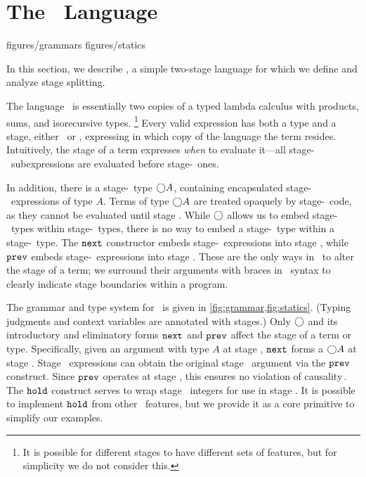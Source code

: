 \section{The \lang\ Language}
\label{sec:semantics}

 {figures/grammars}
 {figures/statics}

In this section, we describe \lang, a simple two-stage language
for which we define and analyze stage splitting.

The language \lang\ is essentially two copies of a typed lambda calculus with
products, sums, and isorecursive types.%
\footnote{It is possible for different stages to have different sets of
features, but for simplicity we do not consider this.}
Every valid expression has both a type and a stage, either \bbone~or \bbtwo,
expressing in which copy of the language the term resides. Intuitively, the
stage of a term expresses \emph{when} to evaluate it---all stage-\bbone\
subexpressions are evaluated before stage-\bbtwo\ ones.

In addition, there is a stage-\bbone\ type $\bigcirc A$, containing encapsulated
stage-\bbtwo\ expressions of type $A$. Terms of type $\bigcirc A$ are treated
opaquely by stage-\bbone\ code, as they cannot be evaluated until stage \bbtwo.
While $\bigcirc$ allows us to embed stage-\bbtwo\ types within stage-\bbone\ types,
there is no way to embed a stage-\bbone\ type within a stage-\bbtwo\ type.
The ${\tt next}$ constructor embeds stage-\bbtwo\ expressions into stage \bbone,
while ${\tt prev}$ embeds stage-\bbone\ expressions into stage \bbtwo.  These are the
only ways in \lang\ to alter the stage of a term; we surround their arguments
with braces in \lang\ syntax to clearly indicate stage boundaries within a
program.

The grammar and type system for \lang\ is given in
\ref{fig:grammar,fig:statics}. (Typing judgments and context variables are annotated with stages.)
Only $\bigcirc$ and its introductory and eliminatory forms ${\tt next}$ and ${\tt prev}$ affect the stage
of a term or type.
Specifically, given an argument with type $A$ at stage \bbtwo, ${\tt next}$ forms a $\bigcirc A$ at stage \bbone.  
Stage \bbtwo\ expressions can obtain the original stage \bbtwo\ argument via the ${\tt prev}$ construct.  
Since ${\tt prev}$ operates at stage \bbtwo, this ensures no violation of causality\,\cite{cave14}.
The ${\tt hold}$ construct serves to wrap stage \bbone\ integers for use in stage \bbtwo.  
It is possible to implement ${\tt hold}$ from other \lang\ features, but
we provide it as a core primitive to simplify our examples. 

